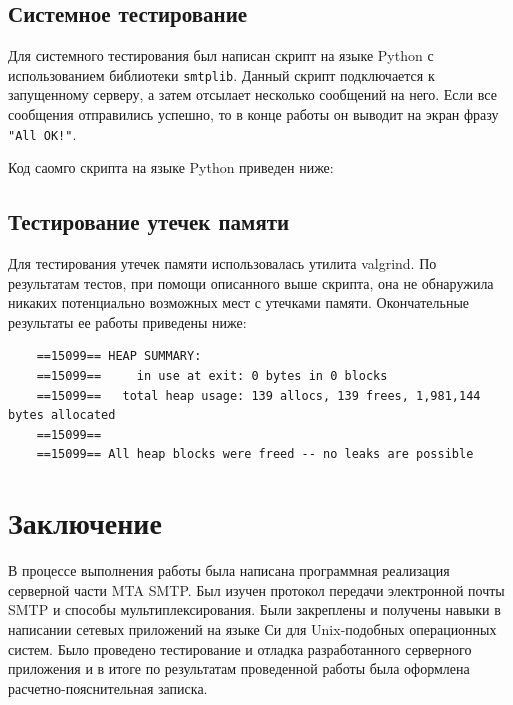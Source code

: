 \documentclass[a4paper,12pt]{report}
\begin{document}
\section{Системное тестирование}

Для системного тестирования был написан скрипт на языке Python с использованием библиотеки \texttt{smtplib}. Данный скрипт подключается к запущенному серверу, а затем отсылает несколько сообщений на него. Если все сообщения отправились успешно, то в конце работы он выводит на экран фразу \texttt{"All OK!"}.

Код саомго скрипта на языке Python приведен ниже:
%


\section{Тестирование утечек памяти}

Для тестирования утечек памяти использовалась утилита valgrind. По результатам тестов, при помощи описанного выше скрипта, она не обнаружила никаких потенциально возможных мест с утечками памяти. Окончательные результаты ее работы приведены ниже:
\begin{verbatim}
    ==15099== HEAP SUMMARY:
    ==15099==     in use at exit: 0 bytes in 0 blocks
    ==15099==   total heap usage: 139 allocs, 139 frees, 1,981,144 bytes allocated
    ==15099== 
    ==15099== All heap blocks were freed -- no leaks are possible
\end{verbatim}


\newpage
{}
\chapter*{Заключение}

В процессе выполнения работы была написана программная реализация серверной части MTA SMTP. Был изучен протокол передачи электронной почты SMTP и способы мультиплексирования. Были закреплены и получены навыки в написании сетевых приложений на языке Си для Unix-подобных операционных систем. Было проведено тестирование и отладка разработанного серверного приложения и в итоге по результатам проведенной работы была оформлена расчетно-пояснительная записка.
\end{document}
